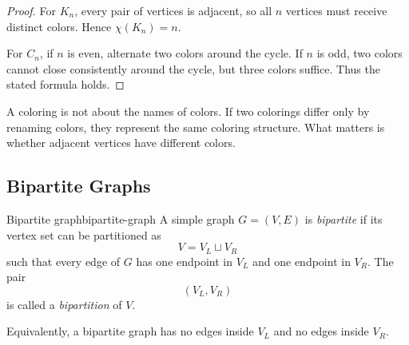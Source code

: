 \begin{proof}
For \(K_n\), every pair of vertices is adjacent, so all \(n\) vertices must receive distinct colors. Hence \(\chi(K_n)=n\).

For \(C_n\), if \(n\) is even, alternate two colors around the cycle. If \(n\) is odd, two colors cannot close consistently around the cycle, but three colors suffice. Thus the stated formula holds.
\end{proof}

\begin{commonmistake}[title={Color labels are arbitrary}]
A coloring is not about the names of colors. If two colorings differ only by renaming colors, they represent the same coloring structure. What matters is whether adjacent vertices have different colors.
\end{commonmistake}

\subsection{Bipartite Graphs}

\begin{definition}{Bipartite graph}{bipartite-graph}
A simple graph \(G=(V,E)\) is \emph{bipartite} if its vertex set can be partitioned as
\[
V=V_L\sqcup V_R
\]
such that every edge of \(G\) has one endpoint in \(V_L\) and one endpoint in \(V_R\). The pair
\[
(V_L,V_R)
\]
is called a \emph{bipartition} of \(V\).
\end{definition}

Equivalently, a bipartite graph has no edges inside \(V_L\) and no edges inside \(V_R\).

\begin{center}
\end{center}

